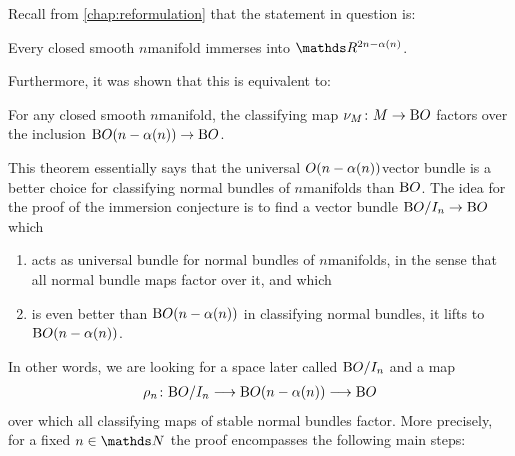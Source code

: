 Recall from \autoref{chap:reformulation} that the statement in
question is:
\begin{Thm*}
  Every closed smooth $n$\nbd{}manifold immerses into
  $\R^{2n-\alpha(n)}$.
\end{Thm*}
Furthermore, it was shown that this is equivalent to:
\begin{Thm*}
  For any closed smooth $n$\nbd{}manifold,
  the classifying map $\nu_{M}\colon M\to\mathrm{B}O$ factors over the
  inclusion $\mathrm{B}O(n-\alpha(n))\to\mathrm{B}O$.
\end{Thm*}
This theorem essentially says that the universal
$O(n-\alpha(n))$\nbd{}vector bundle is a better choice for
classifying normal bundles of $n$\nbd{}manifolds than
$\mathrm{B}O$.
The idea for the proof of the immersion conjecture is to
find a vector bundle $\mathrm{B}O/I_{n}\to\mathrm{B}O$ which
\begin{enumerate}[1.]
\item
  acts as universal bundle for normal bundles of $n$\nbd{}manifolds, in
  the sense that all normal bundle maps factor over it, and which
\item
  is even better than $\mathrm{B}O(n-\alpha(n))$ in classifying normal
  bundles, \idest it lifts to $\mathrm{B}O(n-\alpha(n))$.
\end{enumerate}
In other words, we are looking for a space later called $\mathrm{B}O/I_{n}$
and a map
\begin{gather*}
  \rho_n\colon \mathrm{B}O/I_{n}\longrightarrow\mathrm{B}O(n-\alpha(n))\longrightarrow\mathrm{B}O
\end{gather*}
over which all classifying maps of stable normal bundles factor.
More precisely, for a fixed $n\in\Nat$ the proof
encompasses the following main steps:
